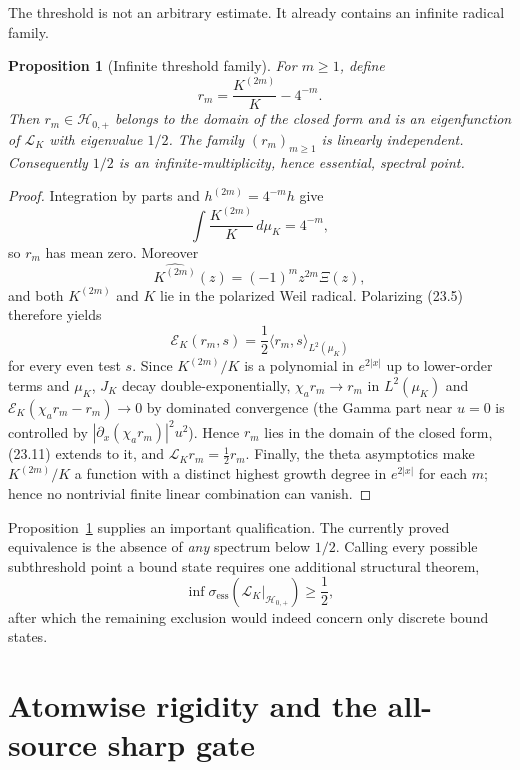 \documentclass[11pt]{amsart}
\newtheorem{proposition}[theorem]{Proposition}
\theoremstyle{definition}
\theoremstyle{remark}
\begin{document}
The threshold is not an arbitrary estimate.  It already contains an
infinite radical family.

\begin{proposition}[Infinite threshold family]
\label{prop:threshold-family}
For \(m\ge1\), define
\[
 r_m=\frac{K^{(2m)}}K-4^{-m}.
\tag{23.10}
\]
Then \(r_m\in\mathcal H_{0,+}\) belongs to the domain of the closed form
and is an eigenfunction of \(\mathcal L_K\) with eigenvalue \(1/2\).
The family \((r_m)_{m\ge1}\) is linearly independent.  Consequently
\(1/2\) is an infinite-multiplicity, hence essential, spectral point.
\end{proposition}

\begin{proof}
Integration by parts and \(h^{(2m)}=4^{-m}h\) give
\[
 \int\frac{K^{(2m)}}K\,d\mu_K=4^{-m},
\]
so \(r_m\) has mean zero.  Moreover
\[
 \widehat{K^{(2m)}}(z)=(-1)^mz^{2m}\Xi(z),
\]
and both \(K^{(2m)}\) and \(K\) lie in the polarized Weil radical.
Polarizing (23.5) therefore yields
\[
 \mathscr E_K(r_m,s)
 =\frac12\langle r_m,s\rangle_{L^2(\mu_K)}
\tag{23.11}
\]
for every even test \(s\).  Since \(K^{(2m)}/K\) is a polynomial in
\(e^{2|x|}\) up to lower-order terms and \(\mu_K\), \(J_K\) decay
double-exponentially, \(\chi_ar_m\to r_m\) in \(L^2(\mu_K)\) and
\(\mathscr E_K(\chi_ar_m-r_m)\to0\) by dominated convergence (the Gamma
part near \(u=0\) is controlled by \(|\partial_x(\chi_ar_m)|^2u^2\)).
Hence \(r_m\) lies in the domain of the closed form, (23.11) extends to
it, and \(\mathcal L_Kr_m=\tfrac12r_m\).  Finally, the theta asymptotics make
\(K^{(2m)}/K\) a function with a distinct highest growth degree in
\(e^{2|x|}\) for each \(m\); hence no nontrivial finite linear
combination can vanish.
\end{proof}

Proposition~\ref{prop:threshold-family} supplies an important qualification.
The currently proved equivalence is the absence of \emph{any} spectrum below
\(1/2\).  Calling every possible subthreshold point a bound state requires
one additional structural theorem,
\[
 \inf\sigma_{\mathrm{ess}}
 (\mathcal L_K|_{\mathcal H_{0,+}})\ge\frac12,
\tag{23.12}
\]
after which the remaining exclusion would indeed concern only discrete
bound states.

\section{Atomwise rigidity and the all-source sharp gate}
\label{sec:atomwise-rigidity}
\end{document}
